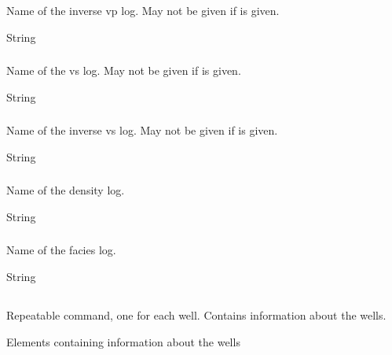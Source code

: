 \subsubsection{}
 \slist
   \item \Description Name of the inverse vp log. May not be given if  is given.
   \item \Argument String
   \item \Default %
 \elist

\subsubsection{}
 \slist
   \item \Description Name of the vs log. May not be given if  is given.
   \item \Argument String
   \item \Default
 \elist

\subsubsection{}
 \slist
   \item \Description Name of the inverse vs log. May not be given if  is given.
   \item \Argument String
   \item \Default %
 \elist

\subsubsection{}
 \slist
   \item \Description Name of the density log.
   \item \Argument String
   \item \Default %
 \elist

\subsubsection{}
 \slist
   \item \Description Name of the facies log.
   \item \Argument String
   \item \Default %
 \elist

\subsection{}
 \slist
   \item \Description Repeatable command, one for each well. Contains information about the wells.
   \item \Argument Elements containing information about the wells
   \item \Default
 \elist

